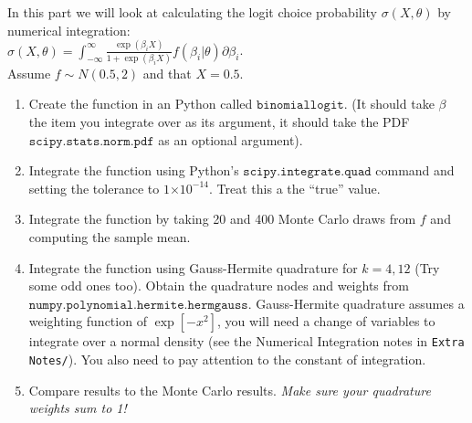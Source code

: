 \documentclass{article}
\providecommand{\e}[1]{\ensuremath{\times 10^{#1}}}
\begin{document}
In this part we will look at calculating the logit choice probability $\sigma(X,\theta)$ by numerical integration:\\
 $\sigma(X,\theta) =\int_{-\infty}^{\infty} \frac{\exp(\beta_i X)}{1+ \exp(\beta_i X)} f(\beta_i | \theta) \partial \beta_i$. \\
 Assume $f \sim N(0.5,2)$ and that $X = 0.5$.
 
\begin{enumerate}
\item Create the function in an Python called $\mathtt{binomiallogit}$. (It should take $\beta$ the item you integrate over as its argument, it should take the PDF $\mathtt{scipy.stats.norm.pdf}$ as an optional argument).

\item Integrate the function using Python's $\mathtt{scipy.integrate.quad}$ command and setting the tolerance to $1\e{-14}$.  Treat this a the ``true'' value.

\item Integrate the function by taking 20 and 400 Monte Carlo draws from $f$ and computing the sample mean.
\item Integrate the function using Gauss-Hermite quadrature for $k=4, 12$ (Try some odd ones too). Obtain the quadrature nodes and weights from $\mathtt{numpy.polynomial.hermite.hermgauss}$. Gauss-Hermite quadrature assumes a weighting function of $\exp[-x^2]$, you will need a change of variables to integrate over a normal density (see the Numerical Integration notes in \texttt{Extra Notes/}). You also need to pay attention to the constant of integration.
\item Compare results to the Monte Carlo results. \textit{Make sure your quadrature weights sum to 1!}


\end{enumerate}
\end{document}

